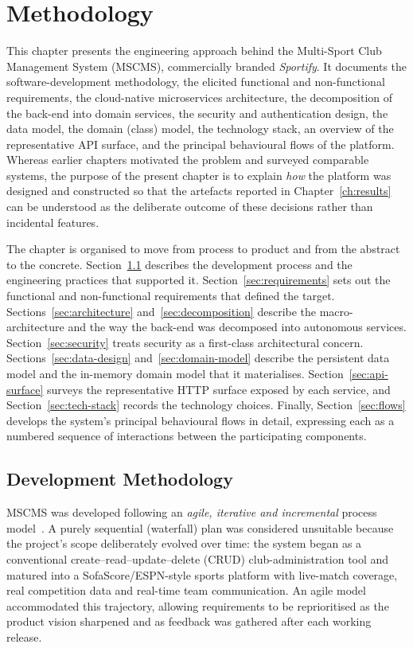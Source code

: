 \chapter{Methodology}
\label{ch:methodology}

This chapter presents the engineering approach behind the Multi-Sport Club
Management System (MSCMS), commercially branded \emph{Sportify}. It documents the
software-development methodology, the elicited functional and non-functional
requirements, the cloud-native microservices architecture, the decomposition of the
back-end into domain services, the security and authentication design, the data
model, the domain (class) model, the technology stack, an overview of the
representative API surface, and the principal behavioural flows of the platform.
Whereas earlier chapters motivated the problem and surveyed comparable systems, the
purpose of the present chapter is to explain \emph{how} the platform was designed and
constructed so that the artefacts reported in Chapter~\ref{ch:results} can be
understood as the deliberate outcome of these decisions rather than incidental
features.

The chapter is organised to move from process to product and from the abstract to
the concrete. Section~\ref{sec:methodology-process} describes the development
process and the engineering practices that supported it.
Section~\ref{sec:requirements} sets out the functional and non-functional
requirements that defined the target. Sections~\ref{sec:architecture}
and~\ref{sec:decomposition} describe the macro-architecture and the way the back-end
was decomposed into autonomous services. Section~\ref{sec:security} treats security
as a first-class architectural concern. Sections~\ref{sec:data-design}
and~\ref{sec:domain-model} describe the persistent data model and the in-memory
domain model that it materialises. Section~\ref{sec:api-surface} surveys the
representative HTTP surface exposed by each service, and
Section~\ref{sec:tech-stack} records the technology choices. Finally,
Section~\ref{sec:flows} develops the system's principal behavioural flows in detail,
expressing each as a numbered sequence of interactions between the participating
components.

\section{Development Methodology}
\label{sec:methodology-process}

MSCMS was developed following an \emph{agile, iterative and incremental} process
model~\cite{agile}. A purely sequential (waterfall) plan was considered unsuitable
because the project's scope deliberately evolved over time: the system began as a
conventional create--read--update--delete (CRUD) club-administration tool and matured
into a SofaScore/ESPN-style sports platform with live-match coverage, real
competition data and real-time team communication. An agile model accommodated this
trajectory, allowing requirements to be reprioritised as the product vision sharpened
and as feedback was gathered after each working release.

